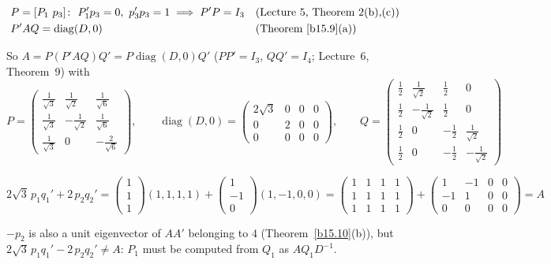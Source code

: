 \documentclass[12pt]{article}
\DeclareMathOperator{\diag}{diag}
\theoremstyle{definition}
\newcommand{\lec}[1]{Lecture~#1}
\newcommand{\boardtop}{\vspace*{-\abovedisplayskip}}
\begin{document}
\begin{board}[\(P\) is orthogonal; \(P_1'P_1=I_2\) (Theorem~\ref{b15.9}(b)):]
\boardtop
\begin{align*}
&P=[P_1\ p_3]\colon\ P_1'p_3=0,\ p_3'p_3=1\implies P'P=I_3&&\text{(\lec{5}, Theorem~2(b),(c))}\\
&P'AQ=\diag(D,0)&&\text{(Theorem~\ref{b15.9}(a))}
\end{align*}
\end{board}
So \(A=P(P'AQ)Q'=P\diag(D,0)Q'\) (\(PP'=I_3\), \(QQ'=I_4\); \lec{6}, Theorem~9) with
\[
P=\begin{pmatrix}\frac1{\sqrt3}&\frac1{\sqrt2}&\frac1{\sqrt6}\\[2pt]\frac1{\sqrt3}&-\frac1{\sqrt2}&\frac1{\sqrt6}\\[2pt]
\frac1{\sqrt3}&0&-\frac2{\sqrt6}\end{pmatrix},\qquad
\diag(D,0)=\begin{pmatrix}2\sqrt3&0&0&0\\0&2&0&0\\0&0&0&0\end{pmatrix},\qquad
Q=\begin{pmatrix}\frac12&\frac1{\sqrt2}&\frac12&0\\[2pt]\frac12&-\frac1{\sqrt2}&\frac12&0\\[2pt]
\frac12&0&-\frac12&\frac1{\sqrt2}\\[2pt]\frac12&0&-\frac12&-\frac1{\sqrt2}\end{pmatrix}
\]
\begin{board}[The compact SVD \(A=2\sqrt3\,p_1q_1'+2\,p_2q_2'\); check:]
\[
2\sqrt3\,p_1q_1'+2\,p_2q_2'=\begin{pmatrix}1\\1\\1\end{pmatrix}(1,1,1,1)+\begin{pmatrix}1\\-1\\0\end{pmatrix}(1,-1,0,0)
=\begin{pmatrix}1&1&1&1\\1&1&1&1\\1&1&1&1\end{pmatrix}+\begin{pmatrix}1&-1&0&0\\-1&1&0&0\\0&0&0&0\end{pmatrix}=A
\]
\end{board}
\(-p_2\) is also a unit eigenvector of \(AA'\) belonging to \(4\) (Theorem~\ref{b15.10}(b)), but
\(2\sqrt3\,p_1q_1'-2\,p_2q_2'\ne A\): \(P_1\) must be computed from \(Q_1\) as \(AQ_1D^{-1}\).
\end{document}
